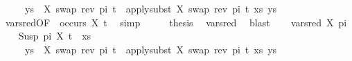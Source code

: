 \begin{isabellebody}
\ \ \ \ \ ys{\isacharparenright}{\kern0pt}\ {\isasymturnstile}\ {\isacharbrackleft}{\kern0pt}{\isacharparenleft}{\kern0pt}X{\isacharcomma}{\kern0pt}\ swap\ {\isacharparenleft}{\kern0pt}rev\ pi{\isacharparenright}{\kern0pt}\ t{}{\isacharparenright}{\kern0pt}{\isacharbrackright}{\kern0pt}\ {\isasymleadsto}\ apply{\isacharunderscore}{\kern0pt}subst\ {\isacharbrackleft}{\kern0pt}{\isacharparenleft}{\kern0pt}X{\isacharcomma}{\kern0pt}\ swap\ {\isacharparenleft}{\kern0pt}rev\ pi{\isacharparenright}{\kern0pt}\ t{}{\isacharparenright}{\kern0pt}{\isacharbrackright}{\kern0pt}\ {\isacharparenleft}{\kern0pt}xs{\isacharcomma}{\kern0pt}\ ys{\isacharparenright}{\kern0pt}{\isachardoublequoteclose}\isanewline
\ \ \ \ \isamarkupfalse%
\ var{\isacharunderscore}{\kern0pt}{}{\isacharunderscore}{\kern0pt}sred{\isacharbrackleft}{\kern0pt}OF\ {\isacartoucheopen}{\isasymnot}\ occurs\ X\ t{}{\isacartoucheclose}{\isacharbrackright}{\kern0pt}\ \isamarkupfalse%
\ simp\isanewline
\ \ \isamarkupfalse%
\ \isamarkupfalse%
\ {\isacharquery}{\kern0pt}thesis\ \isamarkupfalse%
\ var{\isacharunderscore}{\kern0pt}{}{\isacharunderscore}{\kern0pt}sred\ \isamarkupfalse%
\ blast\isanewline
{}\isamarkupfalse%
\isanewline
\ \ \isamarkupfalse%
\ {\isacharparenleft}{\kern0pt}var{\isacharunderscore}{\kern0pt}{}{\isacharunderscore}{\kern0pt}sred\ X\ pi{\isacharparenright}{\kern0pt}\isanewline
\ \ \isamarkupfalse%
\ {\isachardoublequoteopen}{\isacharparenleft}{\kern0pt}{\isacharparenleft}{\kern0pt}Susp\ pi\ X{\isacharcomma}{\kern0pt}\ t{}{\isacharparenright}{\kern0pt}\ {\isacharhash}{\kern0pt}\ xs{\isacharcomma}{\kern0pt}\isanewline
\ \ \ \ \ ys{\isacharparenright}{\kern0pt}\ {\isasymturnstile}\ {\isacharbrackleft}{\kern0pt}{\isacharparenleft}{\kern0pt}X{\isacharcomma}{\kern0pt}\ swap\ {\isacharparenleft}{\kern0pt}rev\ pi{\isacharparenright}{\kern0pt}\ t{}{\isacharparenright}{\kern0pt}{\isacharbrackright}{\kern0pt}\ {\isasymleadsto}\ apply{\isacharunderscore}{\kern0pt}subst\ {\isacharbrackleft}{\kern0pt}{\isacharparenleft}{\kern0pt}X{\isacharcomma}{\kern0pt}\ swap\ {\isacharparenleft}{\kern0pt}rev\ pi{\isacharparenright}{\kern0pt}\ t{}{\isacharparenright}{\kern0pt}{\isacharbrackright}{\kern0pt}\ {\isacharparenleft}{\kern0pt}xs{\isacharcomma}{\kern0pt}\ ys{\isacharparenright}{\kern0pt}{\isachardoublequoteclose}\isanewline

\end{isabellebody}
